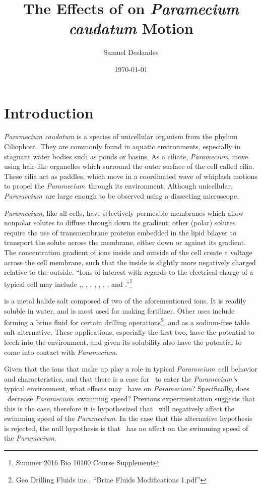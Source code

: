 \documentclass[12pt]{article}
\newcommand{\p}{\textit{Paramecium}}
\newcommand{\kcl}{\ce{KCl}}
\begin{document}
\title{The Effects of  on \textit{Paramecium caudatum} Motion}
\author{Samuel Deslandes}
\date{\today}
\maketitle
\doublespace
\section{Introduction}
	\textit{Paramecium caudatum} is a species of unicellular organism from the phylum Ciliophora. They are commonly found in aquatic environments, especially in stagnant water bodies such as ponds or basins. As a ciliate, \p\ move using hair-like organelles which surround the outer surface of the cell called cilia. These cilia act as paddles, which move in a coordinated wave of whiplash motions to propel the \p\ through its environment. Although unicellular, \p\ are large enough to be observed using a dissecting microscope.  
	
	\p, like all cells, have selectively permeable membranes which allow nonpolar solutes to diffuse through down its gradient; other (polar) solutes require the use of transmembrane proteins embedded in the lipid bilayer to transport the solute across the membrane, either down or against its gradient. The concentration gradient of ions inside and outside of the cell create a voltage across the cell membrane, such that the inside is slightly more negatively charged relative to the outside. ``Ions of interest with regards to the electrical charge of a typical cell may include ,, , , , , , , and .''\footnote{Summer 2016 Bio 10100 Course Supplement}
		 
	 is a metal halide salt composed of two of the aforementioned ions. It is readily soluble in water, and is most used for making fertilizer. Other uses include forming a brine fluid for certain drilling operations\footnote{Geo Drilling Fluids inc., ``Brine Fluids Modifications 1.pdf''}, and as a sodium-free table salt alternative. These applications, especially the first two, have the potential to leech into the environment, and given its solubility also have the potential to come into contact with \p.
	
	Given that the ions that make up  play a role in typical \p\ cell behavior and characteristics, and that there is a case for \kcl\ to enter the \textit{Paramecium's} typical environment, what effects may \kcl\ have on \p? Specifically, does \kcl\ decrease \p\ swimming speed? Previous experimentation suggests that this is the case, therefore it is hypothesized that \kcl\ will negatively affect the swimming speed of the \p. In the case that this alternative hypothesis is rejected, the null hypothesis is that \kcl\ has no affect on the swimming speed of the \p.   
	
\end{document}
